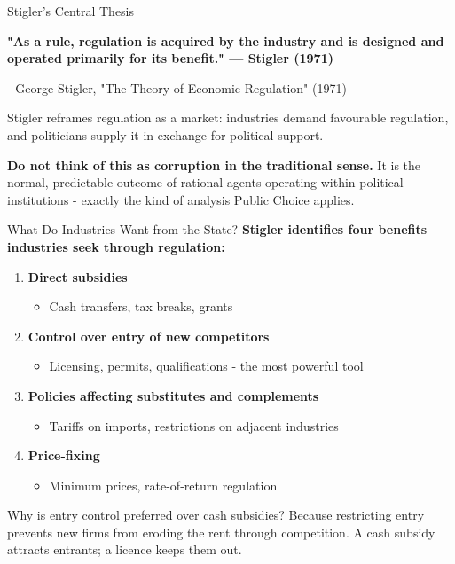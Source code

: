 \documentclass[10pt]{beamer}
\begin{document}
\begin{frame}{Stigler's Central Thesis}


\textbf{"As a rule, regulation is acquired by the industry and is designed and operated primarily for its benefit." — Stigler (1971)}

\vspace{0.1cm}
{\footnotesize - George Stigler, "The Theory of Economic Regulation" (1971)}

\vspace{0.2cm}
Stigler reframes regulation as a \alert{market}: industries demand favourable regulation, and politicians supply it in exchange for political support.

\vspace{0.1cm}
\textbf{Do not think of this as corruption in the traditional sense.}
It is the normal, predictable outcome of rational agents operating within political institutions - exactly the kind of analysis Public Choice applies.
\end{frame}


\begin{frame}{What Do Industries Want from the State?}
\textbf{Stigler identifies four benefits industries seek through regulation:}

\vspace{0.1cm}
\begin{enumerate}
\item \textbf{Direct subsidies}
\begin{itemize}
\item[\footnotesize$\triangleright$] \footnotesize Cash transfers, tax breaks, grants
\end{itemize}

\item \textbf{Control over entry of new competitors}
\begin{itemize}
\item[\footnotesize$\triangleright$] \footnotesize Licensing, permits, qualifications - the most powerful tool
\end{itemize}

\item \textbf{Policies affecting substitutes and complements}
\begin{itemize}
\item[\footnotesize$\triangleright$] \footnotesize Tariffs on imports, restrictions on adjacent industries
\end{itemize}

\item \textbf{Price-fixing}
\begin{itemize}
\item[\footnotesize$\triangleright$] \footnotesize Minimum prices, rate-of-return regulation
\end{itemize}
\end{enumerate}

\vspace{0.1cm}
\alert{Why is entry control preferred over cash subsidies?}
Because restricting entry prevents new firms from eroding the rent through competition.
A cash subsidy attracts entrants; a licence keeps them out.
\end{frame}
\end{document}
